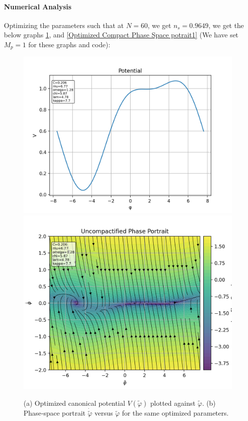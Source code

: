 \documentclass[aps,prd,reprint,preprintnumbers,showpacs,floatfix,nofootinbib,superscript address]{revtex4-2}
\begin{document}
\paragraph*{Numerical Analysis}
Optimizing the parameters such that at $N=60$, we get $n_s = 0.9649$, we get the below graphs \cref{fig:combined_potential_and_phase}, and \cref{Optimized Compact Phase Space potrait1} (We have set $M_p = 1$ for these graphs and code):
\begin{figure}[htb]
  \centering
  {%
    \includegraphics[width=1.0\columnwidth]{Python/results/potential.png}%
  }%
  \\[1ex]  %
  {%
    \includegraphics[width=1.0\columnwidth]{Python/results/phase_uncompact.png}%
  }%
  \caption{%
    (a) Optimized canonical potential $V(\tilde{\varphi})$ plotted against $\tilde{\varphi}$. 
    (b) Phase‐space portrait $\dot{\tilde{\varphi}}$ versus $\tilde{\varphi}$ for the same optimized parameters.%
  }
  \label{fig:combined_potential_and_phase}
\end{figure}
\end{document}
